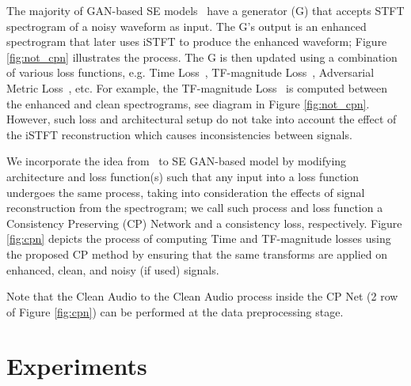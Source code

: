 \documentclass{article}
\begin{document}
The majority of GAN-based SE models~\cite{pmlr-v97-fu19b, cao2022cmgan, 9746273, 9746171} have a generator (G) that accepts STFT spectrogram of a noisy waveform as input. The G's output is an enhanced spectrogram that later uses iSTFT to produce the enhanced waveform; Figure \ref{fig:not_cpn} illustrates the process. The G is then updated using a combination of various loss functions, e.g. Time Loss~\cite{cross_domain_losses_for_se}, TF-magnitude Loss~\cite{Braun2021ACV}, Adversarial Metric Loss~\cite{pmlr-v97-fu19b}, etc. For example, the TF-magnitude Loss~\cite{Braun2021ACV} is computed between the enhanced and clean spectrograms, see diagram in Figure \ref{fig:not_cpn}. However, such loss and architectural setup do not take into account the effect of the iSTFT reconstruction which causes inconsistencies between signals. 



We incorporate the idea from~\cite{Braun2021TowardsEM} to SE GAN-based model by modifying architecture and loss function(s) such that any input into a loss function undergoes the same process, taking into consideration the effects of signal reconstruction from the spectrogram; we call such process and loss function a Consistency Preserving (CP) Network and a consistency loss, respectively. Figure \ref{fig:cpn} depicts the process of computing Time and TF-magnitude losses using the proposed CP method by ensuring that the same transforms are applied on enhanced, clean, and noisy (if used) signals. 

Note that the Clean Audio to the Clean Audio process inside the CP Net (2 row of Figure \ref{fig:cpn}) can be performed at the data preprocessing stage.

\section{Experiments}\label{sec:results}
\end{document}
